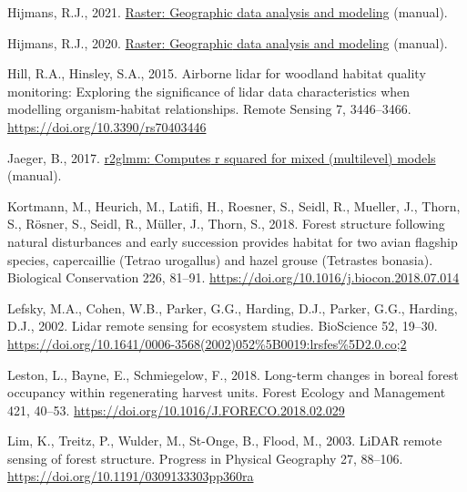 \documentclass[
]{article}
\newlength{\cslhangindent}
\newlength{\cslentryspacingunit} %
\newenvironment{CSLReferences}[2] %
 {%
  \setlength{\parindent}{0pt}
  \ifodd #1
  \let\oldpar\par
  \def\par{\hangindent=\cslhangindent\oldpar}
  \fi
  \setlength{\parskip}{#2\cslentryspacingunit}
 }%
 {}
\begin{document}
\begin{CSLReferences}{1}{0}
\leavevmode{}%
Hijmans, R.J., 2021. \href{https://CRAN.R-project.org/package=raster}{Raster: {Geographic} data analysis and modeling} (manual).

\leavevmode{}%
Hijmans, R.J., 2020. \href{https://CRAN.R-project.org/package=raster}{Raster: {Geographic} data analysis and modeling} (manual).

\leavevmode{}%
Hill, R.A., Hinsley, S.A., 2015. Airborne lidar for woodland habitat quality monitoring: {Exploring} the significance of lidar data characteristics when modelling organism-habitat relationships. Remote Sensing 7, 3446--3466. \url{https://doi.org/10.3390/rs70403446}

\leavevmode{}%
Jaeger, B., 2017. \href{https://CRAN.R-project.org/package=r2glmm}{r2glmm: {Computes} r squared for mixed (multilevel) models} (manual).

\leavevmode{}%
Kortmann, M., Heurich, M., Latifi, H., Roesner, S., Seidl, R., Mueller, J., Thorn, S., Rösner, S., Seidl, R., Müller, J., Thorn, S., 2018. Forest structure following natural disturbances and early succession provides habitat for two avian flagship species, capercaillie ({Tetrao} urogallus) and hazel grouse ({Tetrastes} bonasia). Biological Conservation 226, 81--91. \url{https://doi.org/10.1016/j.biocon.2018.07.014}

\leavevmode{}%
Lefsky, M.A., Cohen, W.B., Parker, G.G., Harding, D.J., Parker, G.G., Harding, D.J., 2002. Lidar remote sensing for ecosystem studies. BioScience 52, 19--30. \url{https://doi.org/10.1641/0006-3568(2002)052\%5B0019:lrsfes\%5D2.0.co;2}

\leavevmode{}%
Leston, L., Bayne, E., Schmiegelow, F., 2018. Long-term changes in boreal forest occupancy within regenerating harvest units. Forest Ecology and Management 421, 40--53. \url{https://doi.org/10.1016/J.FORECO.2018.02.029}

\leavevmode{}%
Lim, K., Treitz, P., Wulder, M., St-Onge, B., Flood, M., 2003. {LiDAR} remote sensing of forest structure. Progress in Physical Geography 27, 88--106. \url{https://doi.org/10.1191/0309133303pp360ra}


\end{CSLReferences}
\end{document}

